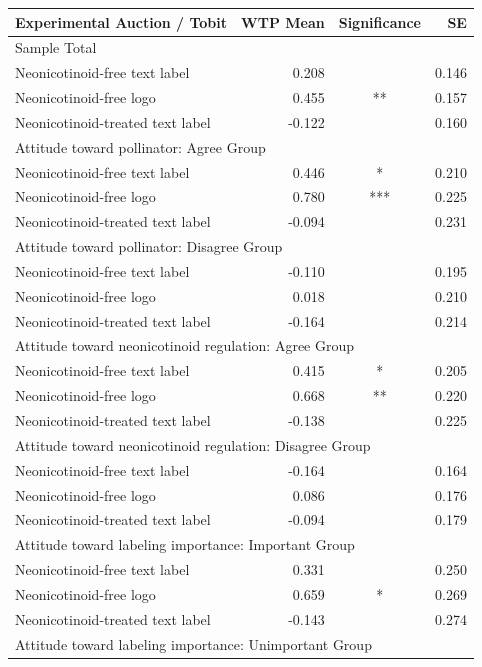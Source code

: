 \begin{tabular}{l r c r}
\hline
Experimental Auction / Tobit & WTP Mean & Significance & SE \\
\hline
\hline
\multicolumn{4}{l}{Sample Total} \\
\hline
Neonicotinoid-free text label &  0.208 &  & 0.146 \\
Neonicotinoid-free logo &  0.455 & ** & 0.157 \\
Neonicotinoid-treated text label & -0.122 &  & 0.160 \\
\hline
\multicolumn{4}{l}{Attitude toward pollinator: Agree Group} \\
\hline
Neonicotinoid-free text label &  0.446 & * & 0.210 \\
Neonicotinoid-free logo &  0.780 & *** & 0.225 \\
Neonicotinoid-treated text label & -0.094 &  & 0.231 \\
\hline
\multicolumn{4}{l}{Attitude toward pollinator: Disagree Group} \\
\hline
Neonicotinoid-free text label & -0.110 &  & 0.195 \\
Neonicotinoid-free logo &  0.018 &  & 0.210 \\
Neonicotinoid-treated text label & -0.164 &  & 0.214 \\
\hline
\multicolumn{4}{l}{Attitude toward neonicotinoid regulation: Agree Group} \\
\hline
Neonicotinoid-free text label &  0.415 & * & 0.205 \\
Neonicotinoid-free logo &  0.668 & ** & 0.220 \\
Neonicotinoid-treated text label & -0.138 &  & 0.225 \\
\hline
\multicolumn{4}{l}{Attitude toward neonicotinoid regulation: Disagree Group} \\
\hline
Neonicotinoid-free text label & -0.164 &  & 0.164 \\
Neonicotinoid-free logo &  0.086 &  & 0.176 \\
Neonicotinoid-treated text label & -0.094 &  & 0.179 \\
\hline
\multicolumn{4}{l}{Attitude toward labeling importance: Important Group} \\
\hline
Neonicotinoid-free text label &  0.331 &  & 0.250 \\
Neonicotinoid-free logo &  0.659 & * & 0.269 \\
Neonicotinoid-treated text label & -0.143 &  & 0.274 \\
\hline
\multicolumn{4}{l}{Attitude toward labeling importance: Unimportant Group} \\

\end{tabular}
